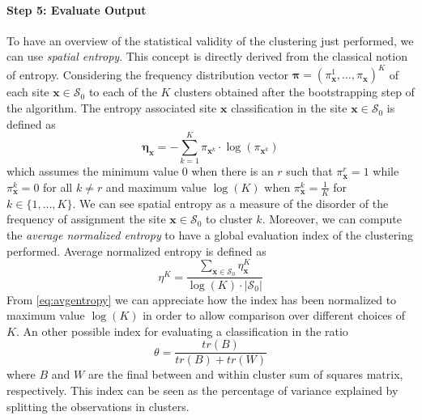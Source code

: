 \paragraph{Step 5: Evaluate Output} To have an overview of the statistical validity of the clustering just performed, we can use \textit{spatial entropy}. This concept is directly derived from the classical notion of entropy. Considering the frequency distribution vector $\boldsymbol{\pi}=(\pi_{\mathbf{x}}^1,\dots,\pi_{\mathbf{x}})^K$ of each site $\mathbf{x} \in \mathcal{S}_0$ to each of the $K$ clusters obtained after the bootstrapping step of the algorithm. The entropy associated site $\mathbf{x}$ classification in the site $\mathbf{x}\in\mathcal{S}_0$ is defined as
\begin{equation}
\mathbf{\eta}_{\mathbf{x}}=-\sum_{k=1}^K\pi_{\mathbf{x}^k}\cdot \log(\pi_{\mathbf{x}^k})
\end{equation}
which assumes the minimum value 0 when there is an $r$ such that $\pi_{\mathbf{x}}^r=1$ while $\pi_{\mathbf{x}}^k=0$ for all $k\neq r$ and maximum value $\log(K)$ when $\pi_{\mathbf{x}}^k=\frac{1}{K}$ for $k\in\{1,\dots,K\}$. We can see spatial entropy as a measure of the disorder of the frequency of assignment the site $\mathbf{x}\in\mathcal{S}_0$ to cluster $k$. Moreover, we can compute the \textit{average normalized entropy} to have a global evaluation index of the clustering performed. Average normalized entropy is defined as
\begin{equation}
\label{eq:avgentropy}
    \eta^K=\frac{\sum_{\textbf{x}\in\mathcal{S}_0}\eta_{\mathbf{x}}^K}{\log(K)\cdot |\mathcal{S}_0|}
\end{equation}
From \ref{eq:avgentropy} we can appreciate how the index has been normalized to maximum value $\log(K)$ in order to allow comparison over different choices of $K$. An other possible index for evaluating a classification in the ratio
\begin{equation}
    \label{eq:theta}
    \theta=\frac{tr(B)}{tr(B)+tr(W)}
\end{equation}
where $B$ and $W$ are the final between and within cluster sum of squares matrix, respectively. This index can be seen as the percentage of variance explained by splitting the observations in clusters.




